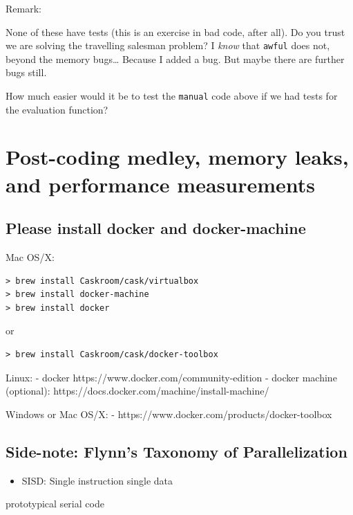 Remark:

None of these have tests (this is an exercise in bad code, after all).
Do you trust we are solving the travelling salesman problem? I
\emph{know} that \texttt{awful} does not, beyond the memory bugs\ldots{}
Because I added a bug. But maybe there are further bugs still.

How much easier would it be to test the \texttt{manual} code above if we
had tests for the evaluation function?

\section{Post-coding medley, memory leaks, and performance
measurements}\label{post-coding-medley-memory-leaks-and-performance-measurements}

\subsection{Please install docker and
docker-machine}\label{please-install-docker-and-docker-machine}

Mac OS/X:

\begin{verbatim}
> brew install Caskroom/cask/virtualbox
> brew install docker-machine
> brew install docker
\end{verbatim}

or

\begin{verbatim}
> brew install Caskroom/cask/docker-toolbox
\end{verbatim}

Linux: - docker https://www.docker.com/community-edition - docker
machine (optional): https://docs.docker.com/machine/install-machine/

Windows or Mac OS/X: - https://www.docker.com/products/docker-toolbox

\subsection{Side-note: Flynn's Taxonomy of
Parallelization}\label{side-note-flynns-taxonomy-of-parallelization}

\begin{itemize}
\itemsep1pt\parskip0pt
\item
  SISD: Single instruction single data
\end{itemize}

prototypical serial code

